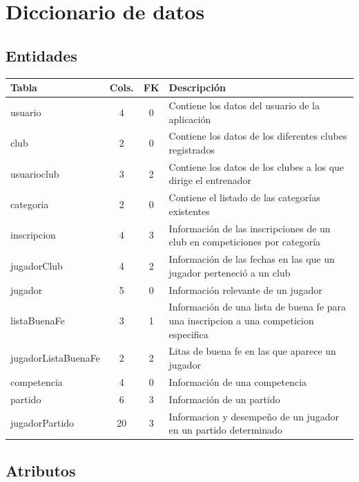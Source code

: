 \section{Diccionario de datos}

\subsection{Entidades}
\begin{table}[H]
	\centering
	\begin{tabularx}{\textwidth}{|l|c|c|X|} \hline
		\textbf{Tabla} & \textbf{Cols.} & \textbf{FK} & \textbf{Descripción} \\ \hline
		usuario     & 4 & 0 & Contiene los datos del usuario de la aplicación \\ \hline
		club        & 2 & 0 & Contiene los datos de los diferentes clubes registrados \\ \hline
		usuarioclub & 3 & 2 & Contiene los datos de los clubes a los que dirige el entrenador \\ \hline
		categoria   & 2 & 0 & Contiene el listado de las categorías existentes \\ \hline
		inscripcion & 4 & 3 & Información de las inscripciones de un club en competiciones por categoría \\ \hline
		jugadorClub & 4 & 2 & Información de las fechas en las que un jugador perteneció a un club \\ \hline
		jugador     & 5 & 0 & Información relevante de un jugador \\ \hline
		listaBuenaFe & 3 & 1 & Información de una lista de buena fe para una inscripcion a una competicion especifica \\ \hline
		jugadorListaBuenaFe & 2 & 2 & Litas de buena fe en las que aparece un jugador \\ \hline
		competencia & 4 & 0 & Información de una competencia \\ \hline
		partido & 6 & 3 & Información de un partido\\ \hline
		jugadorPartido & 20 & 3 & Informacion y desempeño de un jugador en un partido determinado \\ \hline
	\end{tabularx}
\end{table}


\subsection{Atributos}

